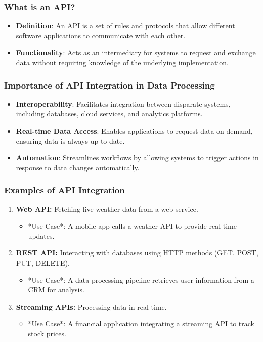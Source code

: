 \documentclass[aspectratio=169]{beamer}
\begin{document}
\begin{frame}
    \frametitle{What is an API?}
    \begin{itemize}
        \item \textbf{Definition}: An API is a set of rules and protocols that allow different software applications to communicate with each other.
        \item \textbf{Functionality}: Acts as an intermediary for systems to request and exchange data without requiring knowledge of the underlying implementation.
    \end{itemize}
\end{frame}

\begin{frame}
    \frametitle{Importance of API Integration in Data Processing}
    \begin{itemize}
        \item \textbf{Interoperability}: Facilitates integration between disparate systems, including databases, cloud services, and analytics platforms.
        \item \textbf{Real-time Data Access}: Enables applications to request data on-demand, ensuring data is always up-to-date.
        \item \textbf{Automation}: Streamlines workflows by allowing systems to trigger actions in response to data changes automatically.
    \end{itemize}
\end{frame}

\begin{frame}
    \frametitle{Examples of API Integration}
    \begin{enumerate}
        \item \textbf{Web API:} Fetching live weather data from a web service.
        \begin{itemize}
            \item *Use Case*: A mobile app calls a weather API to provide real-time updates.
        \end{itemize}
        \item \textbf{REST API:} Interacting with databases using HTTP methods (GET, POST, PUT, DELETE).
        \begin{itemize}
            \item *Use Case*: A data processing pipeline retrieves user information from a CRM for analysis.
        \end{itemize}
        \item \textbf{Streaming APIs:} Processing data in real-time.
        \begin{itemize}
            \item *Use Case*: A financial application integrating a streaming API to track stock prices.
        \end{itemize}
    \end{enumerate}
\end{frame}
\end{document}
